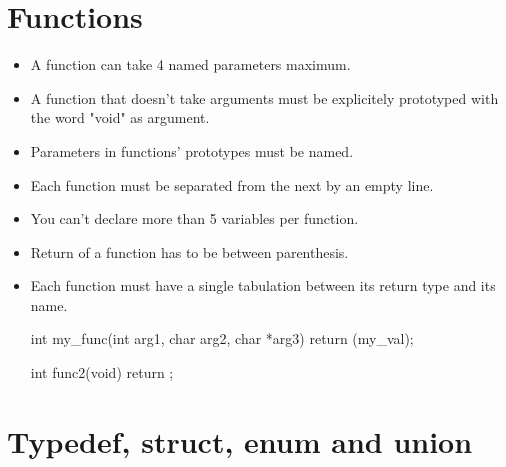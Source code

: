 \documentclass{42-en}
\begin{document}
    \section{Functions}

        \begin{itemize}

            \item A function can take 4 named parameters maximum.

            \item A function that doesn't take arguments must be
                explicitely prototyped with the word "void" as
                argument.

            \item Parameters in functions' prototypes must be named.

            \item Each function must be separated from the next by
                an empty line.

            \item You can't declare more than 5 variables per function.

            \item Return of a function has to be between parenthesis. 

            \item Each function must have a single tabulation between its
                return type and its name.

            \begin{42ccode}
int my_func(int arg1, char arg2, char *arg3)
{
    return (my_val);
}

int func2(void)
{
    return ;
}
            \end{42ccode}

        \end{itemize}
        \newpage


    \section{Typedef, struct, enum and union}
\end{document}
